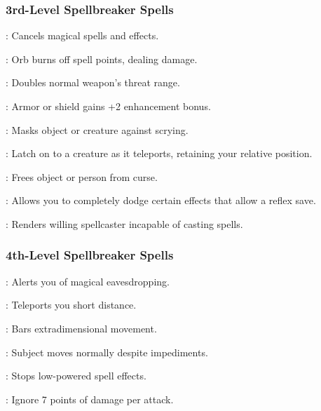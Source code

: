 \subsubsection{3rd-Level Spellbreaker Spells}
\begin{list}{}{\leftmargin=1em}
  \item {}: Cancels magical spells and effects.
  \item {}: Orb burns off spell points, dealing damage.
  \item {}: Doubles normal weapon's threat range.
  \item {}: Armor or shield gains +2 enhancement bonus.
  \item {}: Masks object or creature against scrying.
  \item {}: Latch on to a creature as it teleports, retaining your relative position.
  \item {}: Frees object or person from curse.
  \item {}: Allows you to completely dodge certain effects that allow a reflex save.
  \item {}: Renders willing spellcaster incapable of casting spells.
\end{list}
\subsubsection{4th-Level Spellbreaker Spells}
\begin{list}{}{\leftmargin=1em}
  \item {}: Alerts you of magical eavesdropping.
  \item {}: Teleports you short distance.
  \item {}: Bars extradimensional movement.
  \item {}: Subject moves normally despite impediments.
  \item {}: Stops low-powered spell effects.
  \item {}: Ignore 7 points of damage per attack.
\end{list}
